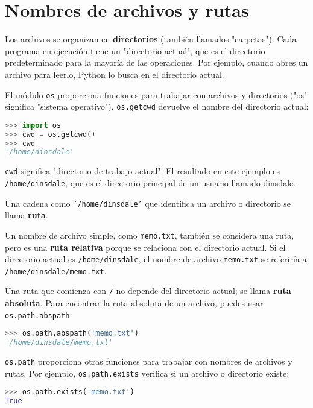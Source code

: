\section{Nombres de archivos y rutas}

Los archivos se organizan en \textbf{directorios} (también llamados "carpetas"). Cada programa en ejecución tiene un "directorio actual", que es el directorio predeterminado para la mayoría de las operaciones. Por ejemplo, cuando abres un archivo para leerlo, Python lo busca en el directorio actual.

El módulo \texttt{os} proporciona funciones para trabajar con archivos y directorios ("os" significa "sistema operativo"). \texttt{os.getcwd} devuelve el nombre del directorio actual:

\begin{lstlisting}[language=Python]
>>> import os
>>> cwd = os.getcwd()
>>> cwd
'/home/dinsdale'
\end{lstlisting}

\texttt{cwd} significa "directorio de trabajo actual". El resultado en este ejemplo es \texttt{/home/dinsdale}, que es el directorio principal de un usuario llamado dinsdale.

Una cadena como \texttt{'/home/dinsdale'} que identifica un archivo o directorio se llama \textbf{ruta}.

Un nombre de archivo simple, como \texttt{memo.txt}, también se considera una ruta, pero es una \textbf{ruta relativa} porque se relaciona con el directorio actual. Si el directorio actual es \texttt{/home/dinsdale}, el nombre de archivo \texttt{memo.txt} se referiría a \texttt{/home/dinsdale/memo.txt}.

Una ruta que comienza con \texttt{/} no depende del directorio actual; se llama \textbf{ruta absoluta}. Para encontrar la ruta absoluta de un archivo, puedes usar \texttt{os.path.abspath}:

\begin{lstlisting}[language=Python]
>>> os.path.abspath('memo.txt')
'/home/dinsdale/memo.txt'
\end{lstlisting}

\texttt{os.path} proporciona otras funciones para trabajar con nombres de archivos y rutas. Por ejemplo, \texttt{os.path.exists} verifica si un archivo o directorio existe:

\begin{lstlisting}[language=Python]
>>> os.path.exists('memo.txt')
True
\end{lstlisting}


